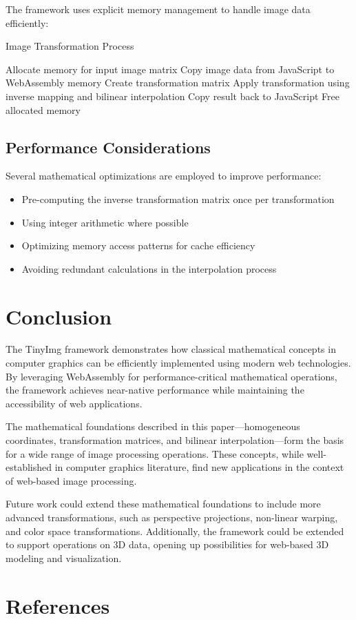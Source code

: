 \documentclass{article}
\begin{document}
The framework uses explicit memory management to handle image data efficiently:

\begin{algorithm}
\caption{Image Transformation Process}
\begin{algorithmic}[1]
\State Allocate memory for input image matrix
\State Copy image data from JavaScript to WebAssembly memory
\State Create transformation matrix
\State Apply transformation using inverse mapping and bilinear interpolation
\State Copy result back to JavaScript
\State Free allocated memory
\end{algorithmic}
\end{algorithm}

\subsection{Performance Considerations}

Several mathematical optimizations are employed to improve performance:

\begin{itemize}
    \item Pre-computing the inverse transformation matrix once per transformation
    \item Using integer arithmetic where possible
    \item Optimizing memory access patterns for cache efficiency
    \item Avoiding redundant calculations in the interpolation process
\end{itemize}

\section{Conclusion}

The TinyImg framework demonstrates how classical mathematical concepts in computer graphics can be efficiently implemented using modern web technologies. By leveraging WebAssembly for performance-critical mathematical operations, the framework achieves near-native performance while maintaining the accessibility of web applications.

The mathematical foundations described in this paper—homogeneous coordinates, transformation matrices, and bilinear interpolation—form the basis for a wide range of image processing operations. These concepts, while well-established in computer graphics literature, find new applications in the context of web-based image processing.

Future work could extend these mathematical foundations to include more advanced transformations, such as perspective projections, non-linear warping, and color space transformations. Additionally, the framework could be extended to support operations on 3D data, opening up possibilities for web-based 3D modeling and visualization.

\section{References}
\end{document}
